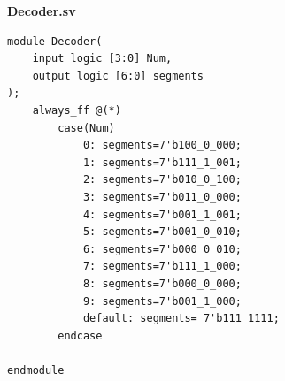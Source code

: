\documentclass[12pt]{article}
\begin{document}
\begin{center}
  \textbf{Decoder.sv}
\end{center}

\begin{verbatim}
module Decoder(
    input logic [3:0] Num,
    output logic [6:0] segments
);
    always_ff @(*)
        case(Num)
            0: segments=7'b100_0_000;
            1: segments=7'b111_1_001;
            2: segments=7'b010_0_100;
            3: segments=7'b011_0_000;
            4: segments=7'b001_1_001;
            5: segments=7'b001_0_010;
            6: segments=7'b000_0_010;
            7: segments=7'b111_1_000;
            8: segments=7'b000_0_000;
            9: segments=7'b001_1_000;
            default: segments= 7'b111_1111;
        endcase

endmodule
\end{verbatim}

% 
% 
\end{document}
